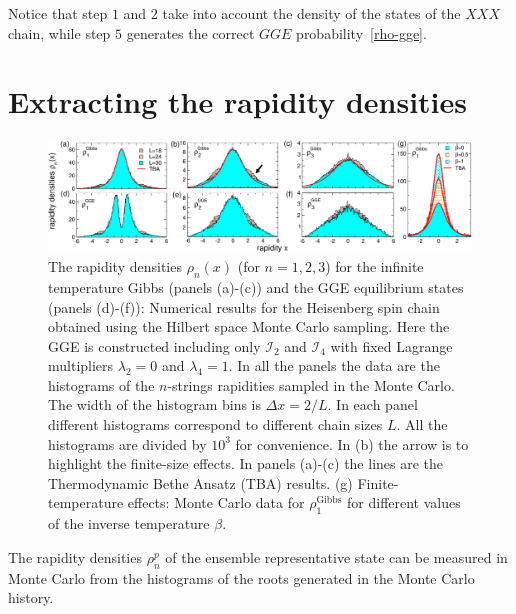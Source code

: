 \documentclass[twocolumn,superscriptaddress,prb,10pt]{revtex4-1}
\begin{document}
Notice that step $1$ and $2$ take into account the density of the states of the $XXX$ 
chain, while step $5$ generates the correct $GGE$ probability~\eqref{rho-gge}. 

\section{Extracting the rapidity densities}

\begin{figure}[t]
\includegraphics*[width=0.99\linewidth]{./draft_figs/fig2}
\caption{The rapidity densities $\rho_n(x)$ (for $n=1,2,3$) for the infinite temperature 
 Gibbs (panels (a)-(c)) and the GGE equilibrium states (panels (d)-(f)): Numerical  
 results for the Heisenberg spin chain obtained using the Hilbert space Monte Carlo 
 sampling. Here the GGE is constructed including only ${\mathcal I}_2$ and ${\mathcal I}_4$ 
 with fixed Lagrange multipliers $\lambda_2=0$ and $\lambda_4=1$. In all the panels the 
 data are the histograms of the $n$-strings rapidities sampled in the Monte Carlo.
 The width of the histogram bins is $\Delta x=2/L$. In each panel different histograms 
 correspond to different chain sizes $L$. All the histograms are divided by $10^3$ for 
 convenience. In (b) the arrow is to highlight the finite-size effects. In panels (a)-(c) 
 the lines are the Thermodynamic Bethe Ansatz (TBA) results. (g) Finite-temperature 
 effects: Monte Carlo data for $\rho^{\textrm{Gibbs}}_1$ for different values of the 
 inverse temperature $\beta$.
}
\label{fig1}
\end{figure}

The rapidity densities $\rho_n^p$ of the ensemble representative state can be measured  
in Monte Carlo from the histograms of the roots generated in the Monte Carlo history.  
\end{document}

